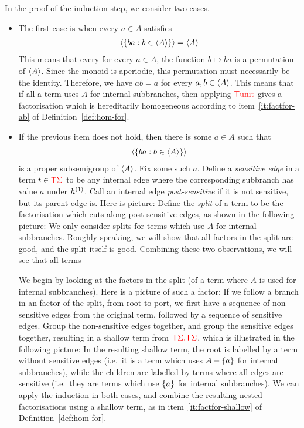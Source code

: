 In the proof of the induction step, we consider two cases.
\begin{itemize}
    \item The first case is  when  every $a \in A$ satisfies 
    \begin{align*}
       \subgen{\set{ b a :  b \in \subgen A}} = \subgen A
  \end{align*}
  This means that every for every $a \in A$, the function $b \mapsto ba$ is a permutation of $\subgen A$. Since the monoid is aperiodic, this permutation must necessarily be the identity.  Therefore, we have $ab=a$ for every $a,b \in \subgen A$. This means that if all a term uses $A$ for  internal subbranches, then applying $\tmonad \unit$  gives a factorisation which is hereditarily homogeneous according to item~\ref{it:factfor-ab} of Definition~\ref{def:hom-for}. 
    \item If the previous item does not hold, then there is some $a \in A$ such that 
    \begin{align*}
         \subgen{\set{ b a :  b \in \subgen A}}
    \end{align*}
    is a proper subsemigroup of $\subgen A$.  Fix some such $a$.  Define a \emph{sensitive edge} in a term  $t \in \tmonad \rSigma$ to be any internal edge where the corresponding subbranch has value $a$ under  $\hb 1 h$. Call an internal edge \emph{post-sensitive} if it is not sensitive, but its parent edge is. Here is picture:
    Define the \emph{split} of a term to be the factorisation which  cuts along post-sensitive  edges, as shown in the following picture:
    We only consider splits for terms which use $A$ for internal subbranches. Roughly speaking,  we will show that all factors in the split are good, and the split itself is good.  Combining these two observations, we will see that all terms 

    We begin by looking at the factors in the split (of a term where $A$ is used for internal subbranches). Here is a picture of such a factor:
        If we follow a  branch in an factor of the split, from root to port, we first  have a sequence of non-sensitive  edges from the original term, followed by a sequence of sensitive edges. Group the non-sensitive edges together, and group the sensitive edges together, resulting in a shallow term from $\shallowterm{\tmonad \rSigma}{\tmonad \rSigma}$, which is illustrated in the following picture:
        In the resulting shallow term,  the root is labelled by a term without sensitive edges (i.e.~it is a term which uses $A - \set a$ for internal subbranches), while the children are labelled by terms where all edges are sensitive (i.e.~they are terms which use $\set a$ for internal subbranches). We can apply the induction in both cases, and combine the resulting nested factorisations using a shallow term, as in item~\ref{it:factfor-shallow} of Definition~\ref{def:hom-for}.


\end{itemize}
